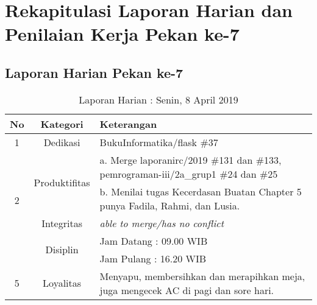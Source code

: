 \section{Rekapitulasi Laporan Harian dan Penilaian Kerja Pekan ke-7}

\subsection{Laporan Harian Pekan ke-7}

\begin{table}[htp]
\begin{center}
\caption{Laporan Harian : Senin, 8 April 2019}
\label{tab:lh080419}
\begin{tabularx}{\textwidth}{|l|l|X|}
\hline
\multicolumn{1}{|c|}{\textbf{No}} & \multicolumn{1}{c|}{\textbf{Kategori}} & \textbf{Keterangan} \\ \hline
\multicolumn{1}{|c|}{\multirow{1}{*}{1}} & \multicolumn{1}{c|}{\multirow{1}{*}{\parbox{2.5cm}{Dedikasi}}}
& BukuInformatika/flask \#37\\
\hline
\multicolumn{1}{|c|}{\multirow{4}{*}{2}} & \multicolumn{1}{c|}{\multirow{2}{*}{\parbox{2.5cm}{Produktifitas}}}
& a. Merge laporanirc/2019 \#131 dan \#133, pemrograman-iii/2a\_grup1 \#24 dan \#25\\
\multicolumn{1}{|c|}{\multirow{1}{*}{}} & \multicolumn{1}{c|}{\multirow{1}{*}{\parbox{2.5cm}{}}}
& b. Menilai tugas Kecerdasan Buatan Chapter 5 punya Fadila, Rahmi, dan Lusia.\\
\hline
\multicolumn{1}{|c|}{\multirow{1}{*}{3}} & \multicolumn{1}{c|}{\multirow{1}{*}{\parbox{2.5cm}{Integritas}}}
& \textit{able to merge/has no conflict} \\
\hline
\multicolumn{1}{|c|}{\multirow{2}{*}{4}} & \multicolumn{1}{c|}{\multirow{2}{*}{\parbox{2.5cm}{Disiplin}}}
& Jam Datang : 09.00 WIB \\
\multicolumn{1}{|c|}{\multirow{1}{*}{}} & \multicolumn{1}{c|}{\multirow{1}{*}{\parbox{2.5cm}{}}}
& Jam Pulang : 16.20 WIB \\
\hline
\multicolumn{1}{|c|}{\multirow{2}{*}{5}} & \multicolumn{1}{c|}{\multirow{2}{*}{\parbox{2.5cm}{Loyalitas}}}
& Menyapu, membersihkan dan merapihkan meja, juga mengecek AC di pagi dan sore hari.\\
\hline
\end{tabularx}
\end{center}
\end{table}

